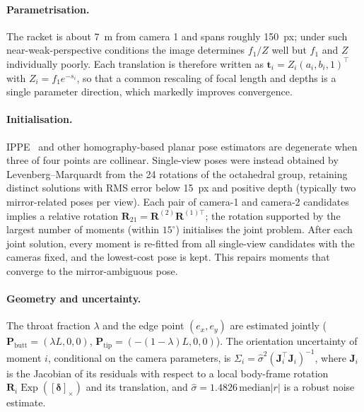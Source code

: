 \documentclass[11pt,a4paper]{article}
\newcommand{\Rm}{\mathbf{R}}
\newcommand{\ve}[1]{\bm{#1}}
\newcommand{\dg}{^{\circ}}
\newcommand{\Exp}{\operatorname{Exp}}
\begin{document}
\paragraph{Parametrisation.} The racket is about \SI{7}{m} from camera 1 and spans roughly
\SI{150}{px}; under such near-weak-perspective conditions the image determines $f_1/Z$ well but
$f_1$ and $Z$ individually poorly. Each translation is therefore written as
$\ve t_i=Z_i(a_i,b_i,1)^{\top}$ with $Z_i=f_1e^{-s_i}$, so that a common rescaling of focal length
and depths is a single parameter direction, which markedly improves convergence.

\paragraph{Initialisation.} IPPE~\cite{collins2014} and other homography-based planar pose
estimators are degenerate when three of four points are collinear. Single-view poses were instead
obtained by Levenberg--Marquardt from the 24 rotations of the octahedral group, retaining distinct
solutions with RMS error below \SI{15}{px} and positive depth (typically two mirror-related poses
per view). Each pair of camera-1 and camera-2 candidates implies a relative rotation
$\Rm_{21}=\Rm^{(2)}\Rm^{(1)\top}$; the rotation supported by the largest number of moments (within
$15\dg$) initialises the joint problem. After each joint solution, every moment is re-fitted from
all single-view candidates with the cameras fixed, and the lowest-cost pose is kept. This repairs
moments that converge to the mirror-ambiguous pose.

\paragraph{Geometry and uncertainty.} The throat fraction $\lambda$ and the edge point
$(e_x,e_y)$ are estimated jointly ($\ve P_{\mathrm{butt}}=(\lambda L,0,0)$,
$\ve P_{\mathrm{tip}}=(-(1-\lambda)L,0,0)$). The orientation uncertainty of moment $i$, conditional
on the camera parameters, is $\Sigma_i=\hat\sigma^2(\mathbf J_i^{\top}\mathbf J_i)^{-1}$, where
$\mathbf J_i$ is the Jacobian of its residuals with respect to a local body-frame rotation
$\Rm_i\Exp([\ve\delta]_\times)$ and its translation, and
$\hat\sigma=1.4826\,\mathrm{median}|r|$ is a robust noise estimate.
\end{document}
